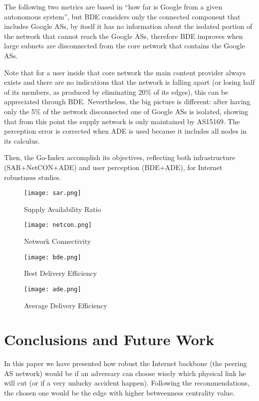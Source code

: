 \documentclass{sig-alternate-10pt}
\begin{document}
The following two metrics are based  in ``how far is Google from a given autonomous system'', but  BDE considers only the connected component that includes Google ASs, by itself it has no information about the isolated portion of the network that cannot reach the Google ASs, therefore BDE improves when large subnets are disconnected from the core network that contains the Google ASs.  

Note that for a user inside that core network the main content provider always exists and there are no indications that the network is falling apart (or losing half of its members, as produced by eliminating 20\% of its edges), this can be appreciated through BDE. Nevertheless, the big picture is different: after having only the 5\% of the network disconnected one of Google ASs is isolated, showing that from this point the supply network is only maintained by AS15169. The perception error is corrected when ADE is used because it includes all nodes in its calculus.

Then, the Go-Index accomplish its objectives, reflecting both infrastructure (SAR+NetCON+ADE) and user perception (BDE+ADE), for Internet robustness studies.

\begin{figure}[th!]
  \centering
  \texttt{[image: sar.png]}
  \caption{Supply Availability Ratio}
  \label{fig:sar}
\end{figure}

\begin{figure}[th!]
  \centering
  \texttt{[image: netcon.png]}
  \caption{Network Connectivity}
  \label{fig:netcon}
\end{figure}

\begin{figure}[th!]
  \centering
  \texttt{[image: bde.png]}
  \caption{Best Delivery Efficiency}
  \label{fig:bde}
\end{figure}

\begin{figure}[th!]
  \centering
  \texttt{[image: ade.png]}
  \caption{Average Delivery Efficiency}
  \label{fig:ade}
\end{figure}

\section{Conclusions and Future Work}
\label{conclusions}

In this paper we have presented how robust the Internet backbone (the peering AS network) would be
if an adversary can choose wisely which physical link he will cut (or if a very unlucky accident happen).
Following the recommendations, the chosen one would be the edge with higher
betweenness centrality value. 
\end{document}
